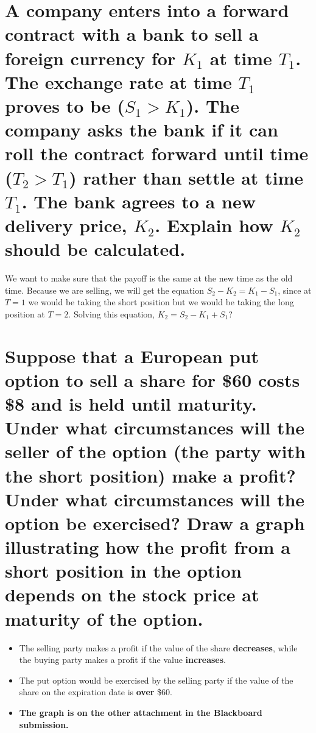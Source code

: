 \documentclass{article}
\begin{document}
\section{A company enters into a forward contract with a bank to sell a foreign currency for $K_{1}$ at time $T_{1}$. The exchange rate at time $T_{1}$ proves to be ($S_{1}> K_{1}$). The company asks the bank if it can roll the contract forward until time ($T_{2}> T_{1}$) rather than settle at time $T_{1}$. The bank agrees to a new delivery price, $K_{2}$. Explain how $K_{2}$ should be calculated.}
\par\noindent\Large We want to make sure that the payoff is the same at the new time as the old time.  Because we are selling, we will get the equation $S_{2} - K_{2} = K_{1} - S_{1}$, since at $T = 1$ we would be taking the short position but we would be taking the long position at $T = 2$.  Solving this equation, $K_{2} = S_{2} - K_{1} + S_{1}$?

\section{Suppose that a European put option to sell a share for \$60 costs \$8 and is held until maturity.  Under what circumstances will the seller of the option (the party with the short position) make a profit? Under what circumstances will the option be exercised? Draw a graph illustrating how the profit from a short position in the option depends on the stock price at maturity of the option.}

\par\noindent\Large \begin{itemize}
\item The selling party makes a profit if the value of the share \textbf{decreases}, while the buying party makes a profit if the value \textbf{increases}.

\item The put option would be exercised by the selling party if the value of the share on the expiration date is \textbf{over} \$60.
\item \textbf{The graph is on the other attachment in the Blackboard submission.}
\end{itemize}
\end{document}
